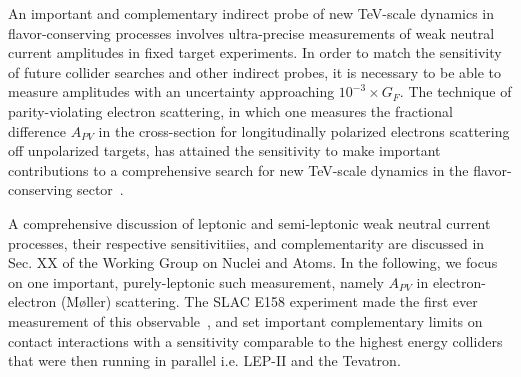 
An important and complementary indirect probe of new TeV-scale dynamics in flavor-conserving processes involves
ultra-precise measurements of weak neutral current amplitudes in fixed target experiments. 
In order to match the sensitivity of future collider
searches and other indirect probes, it is necessary to be able to measure amplitudes with an uncertainty
approaching $10^{-3}\times G_F$. The technique of parity-violating electron scattering, in which one measures
the fractional difference $A_{PV}$ in the cross-section for longitudinally polarized electrons scattering off 
unpolarized  targets, has attained the sensitivity to make important contributions to a comprehensive search for new 
TeV-scale dynamics in the flavor-conserving sector~\cite{ref:cl:kkannualreview}. 

A comprehensive discussion of leptonic and semi-leptonic weak neutral current processes, their respective 
sensitivitiies, and complementarity are discussed in Sec. XX of the Working Group on Nuclei and Atoms. 
In the following, we focus on one important, purely-leptonic such measurement, namely 
$A_{PV}$ in electron-electron (M\o ller) scattering.  
The SLAC E158 experiment made the first ever measurement of this observable~\cite{ref:cl:Anthony:2005pm}, 
and set
important complementary limits on contact interactions with a sensitivity comparable to the highest energy
colliders that were then running in parallel i.e. LEP-II and the Tevatron. 


